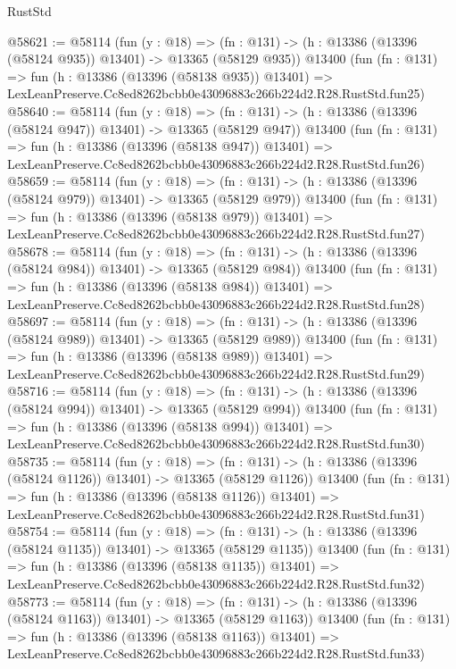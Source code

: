 \begin{lexlean}{RustStd}
\begin{coremodule}
@58621 := @58114
    (fun (y : @18) =>
    (fn : @131) -> (h : @13386 (@13396 (@58124 @935)) @13401) -> @13365 (@58129 @935))
    @13400
    (fun (fn : @131) =>
    fun (h : @13386 (@13396 (@58138 @935)) @13401) =>
    LexLeanPreserve.Cc8ed8262bcbb0e43096883c266b224d2.R28.RustStd.fun25)
@58640 := @58114
    (fun (y : @18) =>
    (fn : @131) -> (h : @13386 (@13396 (@58124 @947)) @13401) -> @13365 (@58129 @947))
    @13400
    (fun (fn : @131) =>
    fun (h : @13386 (@13396 (@58138 @947)) @13401) =>
    LexLeanPreserve.Cc8ed8262bcbb0e43096883c266b224d2.R28.RustStd.fun26)
@58659 := @58114
    (fun (y : @18) =>
    (fn : @131) -> (h : @13386 (@13396 (@58124 @979)) @13401) -> @13365 (@58129 @979))
    @13400
    (fun (fn : @131) =>
    fun (h : @13386 (@13396 (@58138 @979)) @13401) =>
    LexLeanPreserve.Cc8ed8262bcbb0e43096883c266b224d2.R28.RustStd.fun27)
@58678 := @58114
    (fun (y : @18) =>
    (fn : @131) -> (h : @13386 (@13396 (@58124 @984)) @13401) -> @13365 (@58129 @984))
    @13400
    (fun (fn : @131) =>
    fun (h : @13386 (@13396 (@58138 @984)) @13401) =>
    LexLeanPreserve.Cc8ed8262bcbb0e43096883c266b224d2.R28.RustStd.fun28)
@58697 := @58114
    (fun (y : @18) =>
    (fn : @131) -> (h : @13386 (@13396 (@58124 @989)) @13401) -> @13365 (@58129 @989))
    @13400
    (fun (fn : @131) =>
    fun (h : @13386 (@13396 (@58138 @989)) @13401) =>
    LexLeanPreserve.Cc8ed8262bcbb0e43096883c266b224d2.R28.RustStd.fun29)
@58716 := @58114
    (fun (y : @18) =>
    (fn : @131) -> (h : @13386 (@13396 (@58124 @994)) @13401) -> @13365 (@58129 @994))
    @13400
    (fun (fn : @131) =>
    fun (h : @13386 (@13396 (@58138 @994)) @13401) =>
    LexLeanPreserve.Cc8ed8262bcbb0e43096883c266b224d2.R28.RustStd.fun30)
@58735 := @58114
    (fun (y : @18) =>
    (fn : @131) -> (h : @13386 (@13396 (@58124 @1126)) @13401) -> @13365 (@58129 @1126))
    @13400
    (fun (fn : @131) =>
    fun (h : @13386 (@13396 (@58138 @1126)) @13401) =>
    LexLeanPreserve.Cc8ed8262bcbb0e43096883c266b224d2.R28.RustStd.fun31)
@58754 := @58114
    (fun (y : @18) =>
    (fn : @131) -> (h : @13386 (@13396 (@58124 @1135)) @13401) -> @13365 (@58129 @1135))
    @13400
    (fun (fn : @131) =>
    fun (h : @13386 (@13396 (@58138 @1135)) @13401) =>
    LexLeanPreserve.Cc8ed8262bcbb0e43096883c266b224d2.R28.RustStd.fun32)
@58773 := @58114
    (fun (y : @18) =>
    (fn : @131) -> (h : @13386 (@13396 (@58124 @1163)) @13401) -> @13365 (@58129 @1163))
    @13400
    (fun (fn : @131) =>
    fun (h : @13386 (@13396 (@58138 @1163)) @13401) =>
    LexLeanPreserve.Cc8ed8262bcbb0e43096883c266b224d2.R28.RustStd.fun33)

\end{coremodule}
\end{lexlean}
